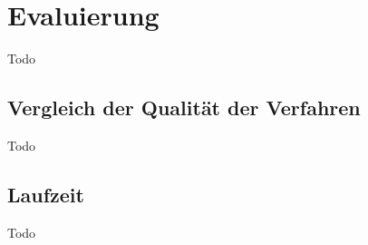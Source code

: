 \chapter{Evaluierung}

Todo

\section{Vergleich der Qualität der Verfahren}

Todo

\section{Laufzeit}

Todo